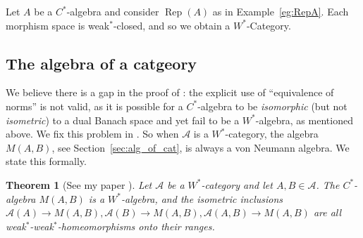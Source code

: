 \documentclass[a4paper,11pt]{article}
\theoremstyle{plain}
\newtheorem{theorem}[proposition]{Theorem}
\theoremstyle{remark}
\newenvironment{example}
  {\pushQED{\qed}\renewcommand{\qedsymbol}{$\triangle$}\examplex}
  {\popQED\endexamplex}
\newcommand{\mc}[1]{\mathcal{#1}}
\newcommand{\Rep}{\operatorname{Rep}}
\begin{document}
\begin{example}\label{eg:RepA_is_WStar}
Let $A$ be a $C^*$-algebra and consider $\Rep(A)$ as in Example~\ref{eg:RepA}.  Each morphism space is weak$^*$-closed, and so we obtain a $W^*$-Category.
\end{example}

\subsection{The algebra of a catgeory}

We believe there is a gap in the proof of \cite[Lemma~2.6]{GLR_Wstar_categories}: the explicit use of ``equivalence of norms'' is not valid, as it is possible for a $C^*$-algebra to be \emph{isomorphic} (but not \emph{isometric}) to a dual Banach space and yet fail to be a $W^*$-algebra, as mentioned above.  We fix this problem in \cite{TODO}.  So when $\mc A$ is a $W^*$-category, the algebra $M(A,B)$, see Section~\ref{sec:alg_of_cat}, is always a von Neumann algebra.  We state this formally.

\begin{theorem}[{See my paper \cite{TODO}}]\label{thm:MAB_WStar}
Let $\mc A$ be a $W^*$-category and let $A,B\in\mc A$.  The $C^*$-algebra $M(A,B)$ is a $W^*$-algebra, and the isometric inclusions $\mc A(A) \to M(A,B), \mc A(B) \to M(A,B), \mc A(A,B) \to M(A,B)$ are all weak$^*$-weak$^*$-homeomorphisms onto their ranges.
\end{theorem}
\end{document}

